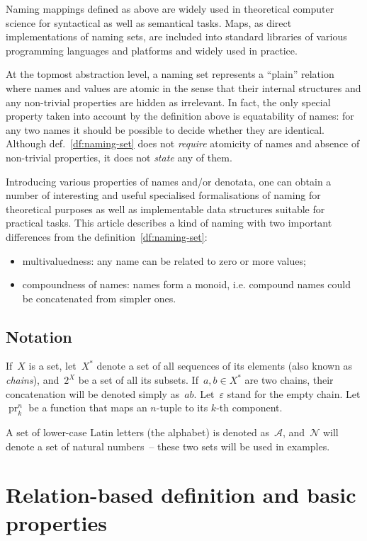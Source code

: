 \documentclass{article}
\theoremstyle{definition}
\newcommand{\seta}{\mathcal{A}}
\newcommand{\setn}{\mathcal{N}}
\newcommand{\proj}[2]{\operatorname{pr}^{#1}_{#2}}
\begin{document}
Naming mappings defined as above are widely used in theoretical computer
science for syntactical as well as semantical tasks.
Maps, as direct
implementations of naming sets, are included into standard libraries of various
programming languages and platforms and widely used in practice.

At the topmost abstraction level, a naming set represents a ``plain'' relation
where names and values are atomic in the sense that their internal structures
and any non-trivial properties are hidden as irrelevant.  In fact, the only
special property taken into account by the definition above is equatability of
names: for any two names it should be possible to decide whether they are
identical.  Although def.~\ref{df:naming-set} does not \emph{require} atomicity
of names and absence of non-trivial properties, it does not \emph{state} any of
them.

Introducing various properties of names and/or denotata, one can obtain a
number of interesting and useful specialised formalisations of naming for
theoretical purposes as well as implementable data structures suitable for
practical tasks. This article describes a kind of naming with
two important differences from the definition~\ref{df:naming-set}:
\begin{itemize}
\item multivaluedness: any name can be related to zero or more values;
\item compoundness of names: names form a monoid, i.e. compound names could
be concatenated from simpler ones.
\end{itemize}

\subsection*{Notation}

If~$X$ is a set, let~$X^\ast$ denote a set of all sequences of its elements
(also known as \emph{chains}), and~$2^X$ be a set of all its subsets.
If~$a,b\in X^\ast$ are two chains, their concatenation will be denoted simply
as~$ab$. Let~$\varepsilon$ stand for the empty chain.
Let $\proj{n}{k}$ be a function that maps an $n$-tuple to its $k$-th component.

A set of lower-case Latin letters (the alphabet) is denoted as~$\seta$,
and~$\setn$ will denote a set of natural numbers~-- these two sets will be
used in examples.



\section{Relation-based definition and basic properties}
\end{document}
